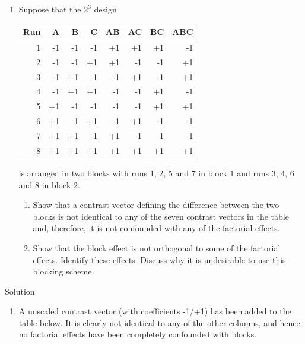 \documentclass[
]{book}
\providecommand{\tightlist}{%
  \setlength{\itemsep}{0pt}\setlength{\parskip}{0pt}}
\theoremstyle{definition}
\theoremstyle{definition}
\theoremstyle{definition}
\theoremstyle{definition}
\theoremstyle{remark}
\begin{document}
\begin{enumerate}
\def\labelenumi{\arabic{enumi}.}
\setcounter{enumi}{2}
\item
  Suppose that the \(2^3\) design

  \begin{longtable}[]{@{}rrrrrrrr@{}}
  \toprule
  Run & A & B & C & AB & AC & BC & ABC \\
  \midrule
  \endhead
  1 & -1 & -1 & -1 & +1 & +1 & +1 & -1 \\
  2 & -1 & -1 & +1 & +1 & -1 & -1 & +1 \\
  3 & -1 & +1 & -1 & -1 & +1 & -1 & +1 \\
  4 & -1 & +1 & +1 & -1 & -1 & +1 & -1 \\
  5 & +1 & -1 & -1 & -1 & -1 & +1 & +1 \\
  6 & +1 & -1 & +1 & -1 & +1 & -1 & -1 \\
  7 & +1 & +1 & -1 & +1 & -1 & -1 & -1 \\
  8 & +1 & +1 & +1 & +1 & +1 & +1 & +1 \\
  \bottomrule
  \end{longtable}

  is arranged in two blocks with runs 1, 2, 5 and 7 in block 1 and runs 3, 4, 6 and 8 in block 2.

  \begin{enumerate}
  \def\labelenumii{\alph{enumii}.}
  \item
    Show that a contrast vector defining the difference between the two blocks is not identical to any of the seven contrast vectors in the table and, therefore, it is not confounded with any of the factorial effects.
  \item
    Show that the block effect is not orthogonal to some of the factorial effects. Identify these effects. Discuss why it is undesirable to use this blocking scheme.
  \end{enumerate}
\end{enumerate}

Solution

\begin{enumerate}
\def\labelenumi{\alph{enumi}.}
\tightlist
\item
  A unscaled contrast vector (with coefficients -1/+1) has been added to the table below. It is clearly not identical to any of the other columns, and hence no factorial effects have been completely confounded with blocks.
\end{enumerate}
\end{document}
